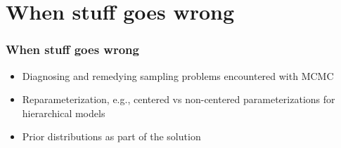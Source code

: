 \documentclass{beamer}
\begin{document}


  


\section{When stuff goes wrong}

\begin{frame}
  \frametitle{When stuff goes wrong}
  
  \begin{itemize}
  \item Diagnosing and remedying sampling problems encountered with MCMC
\item Reparameterization, e.g., centered vs non-centered parameterizations for hierarchical models
\item Prior distributions as part of the solution
  \end{itemize}

\end{frame}
\end{document}
